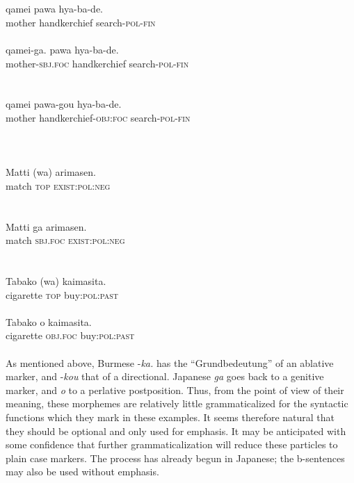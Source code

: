 \ea\label{ex:E101}
 \\
 \ea {}\\
 \gll  qamei  pawa  hya-ba-de.\\
  mother  handkerchief  search-\textsc{pol}-\textsc{fin}\\
\\
\ex
\gll  qamei-ga.  pawa  hya-ba-de.\\
 mother-\textsc{sbj}.\textsc{foc}  handkerchief search-\textsc{pol}-\textsc{fin}\\
\\
\ex {}\\
\gll qamei pawa-gou hya-ba-de.\\
mother handkerchief-\textsc{obj}:\textsc{foc}  search-\textsc{pol}-\textsc{fin}\\
\\
\z
\z
\noindent \ea\label{ex:E102}
\langinfo{\LangJap}{}{}  \\
 \ea {}\\
 \gll  Matti  (wa)  arimasen.\\
 match  \textsc{top}  \textsc{exist}:\textsc{pol}:\textsc{neg}\\
\\
\ex {}\\
\gll  Matti  ga  arimasen.\\
 match  \textsc{sbj}.\textsc{foc} \textsc{exist}:\textsc{pol}:\textsc{neg}\\
\\
\z
\z
\noindent \ea\label{ex:E103}
\\
 \ea
 \gll  Tabako  (wa)  kaimasita.\\
   cigarette  \textsc{top}  buy:\textsc{pol}:\textsc{past}\\
\\
\ex
\gll  Tabako  o  kaimasita.\\
  cigarette  \textsc{obj}.\textsc{foc}  buy:\textsc{pol}:\textsc{past}\\
\\
\z
\z
\noindent As mentioned above, Burmese -\textit{ka.} has the ``Grundbedeutung'' of an ablative marker, and -\textit{kou} that of a directional. Japanese \textit{ga} goes back to a genitive marker, and \textit{o} to a perlative postposition. Thus, from the point of view of their meaning, these morphemes are relatively little grammaticalized for the syntactic functions which they mark in these examples. It seems therefore natural that they should be optional and only used for emphasis. It may be anticipated with some confidence that further grammaticalization will reduce these particles to plain case markers. The process has already begun in Japanese; the b-sentences may also be used without emphasis.

